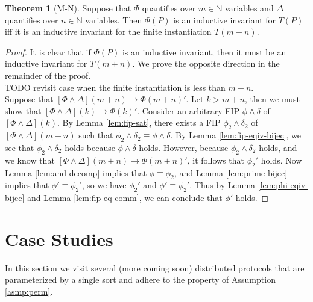 \documentclass[12pt]{article}
\theoremstyle{definition}
\newtheorem{theorem}{Theorem}
\theoremstyle{remark}
\begin{document}
\begin{theorem}[M-N]
  Suppose that $\Phi$ quantifies over $m \in \mathbb{N}$ variables and $\Delta$ quantifies over $n \in \mathbb{N}$ variables.  Then $\Phi(P)$ is an inductive invariant for $T(P)$ iff it is an inductive invariant for the finite instantiation $T(m+n)$.
\end{theorem}
\begin{proof}
  It is clear that if $\Phi(P)$ is an inductive invariant, then it must be an inductive invariant for $T(m+n)$.  We prove the opposite direction in the remainder of the proof.\\

  TODO revisit case when the finite instantiation is less than $m+n$.\\

  Suppose that $[\Phi\land\Delta](m+n) \rightarrow \Phi(m+n)'$.  Let $k > m+n$, then we must show that $[\Phi\land\Delta](k) \rightarrow \Phi(k)'$.  Consider an arbitrary FIP $\phi\land\delta$ of $[\Phi\land\Delta](k)$.  By Lemma \ref{lem:fip-sat}, there exists a FIP $\phi_2\land\delta_2$ of $[\Phi\land\Delta](m+n)$ such that $\phi_2\land\delta_2 \equiv \phi\land\delta$.  By Lemma \ref{lem:fip-eqiv-bijec}, we see that $\phi_2\land\delta_2$ holds because $\phi\land\delta$ holds.  However, because $\phi_2\land\delta_2$ holds, and we know that $[\Phi\land\Delta](m+n) \rightarrow \Phi(m+n)'$, it follows that $\phi_2'$ holds.  Now Lemma \ref{lem:and-decomp} implies that $\phi \equiv \phi_2$, and Lemma \ref{lem:prime-bijec} implies that $\phi' \equiv \phi_2'$, so we have $\phi_2'$ and $\phi' \equiv \phi_2'$.  Thus by Lemma \ref{lem:phi-eqiv-bijec} and Lemma \ref{lem:fip-eq-comm}, we can conclude that $\phi'$ holds.
\end{proof}


\section{Case Studies}
In this section we visit several (more coming soon) distributed protocols that are parameterized by a single sort and adhere to the property of Assumption \ref{asmp:perm}.
\end{document}

